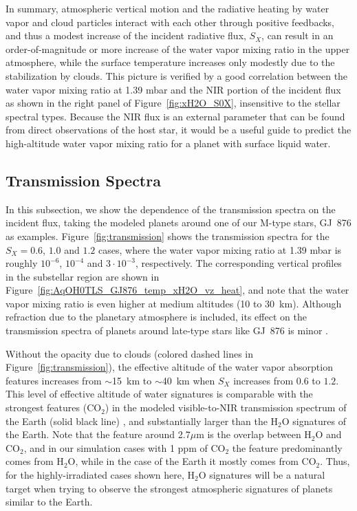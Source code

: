 \documentclass[11pt,numberedappendix,twocolappendix,]{emulateapj}
\def\water{H$_2$O}
\def\preslevel{1.39 mbar}
\def\wv{water vapor}
\begin{document}
In summary, atmospheric vertical motion and the radiative heating by \wv{} and cloud particles interact with each other through positive feedbacks, and thus a modest increase of the incident radiative flux, $S_X$, can result in  an order-of-magnitude or more increase of the \wv{} mixing ratio in the upper atmosphere, while the surface temperature increases only modestly due to the stabilization by clouds. 
This picture is verified by a good correlation between the \wv{} mixing ratio at \preslevel{} and the NIR portion of the incident flux as shown in the right panel of Figure~\ref{fig:xH2O_S0X}, insensitive to the stellar spectral types. %
Because the NIR flux is an external parameter that can be found from direct observations of the host star, it would be a useful guide to predict the high-altitude \wv{}  mixing ratio for a planet with surface liquid water.  %


\subsection{Transmission Spectra}
\label{ss:result_TransmissionSpectra}


In this subsection, we show the dependence of the transmission spectra on the incident flux, taking the modeled planets around one of our M-type stars, GJ~876 as examples. 
Figure~\ref{fig:transmission} shows the transmission spectra for the $S_X=0.6$, $1.0$ and $1.2$ cases, where the \wv{} mixing ratio at \preslevel{} is roughly $10^{-6}$, $10^{-4}$ and $3\cdot 10^{-3}$, respectively. 
The corresponding vertical profiles in the substellar region are shown in Figure~\ref{fig:AqOH0TLS_GJ876_temp_xH2O_vz_heat}, and note that the \wv{} mixing ratio is even higher at medium altitudes (10 to 30~km).
Although refraction due to the planetary atmosphere is included, its effect on the transmission spectra of planets around late-type stars like GJ~876 is minor \citep{Betremieux2014,Misra2014}. 

Without the opacity due to clouds (colored dashed lines in Figure~\ref{fig:transmission}), the effective altitude of the water vapor absorption features increases from $\sim $15~km to $\sim $40~km when $S_X$ increases from $0.6$ to $1.2$. 
This level of effective altitude of water signatures is comparable with the strongest features (CO$_2$) in the modeled visible-to-NIR transmission spectrum of the Earth (solid black line) , and substantially larger than the H$_2$O signatures of the Earth. %
Note that the feature around 2.7$\mu $m is the overlap between H$_2$O and CO$_2$, and in our simulation cases with 1 ppm of CO$_2$ the feature predominantly comes from H$_2$O, while in the case of the Earth it mostly comes from CO$_2$. 
Thus, for the highly-irradiated cases shown here, \water{} signatures will be a natural target when trying to observe the strongest atmospheric signatures of planets similar to the Earth. 
\end{document}
